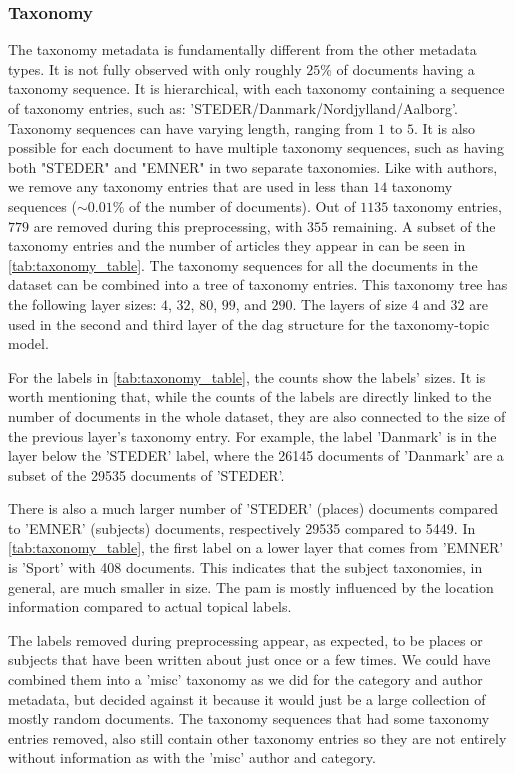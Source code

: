 \subsubsection{Taxonomy}\label{subsec:appendix_taxonomy}
The taxonomy metadata is fundamentally different from the other metadata types.
It is not fully observed with only roughly $25\%$ of documents having a taxonomy sequence.
It is hierarchical, with each taxonomy containing a sequence of taxonomy entries, such as: 'STEDER/Danmark/Nordjylland/Aalborg'.
Taxonomy sequences can have varying length, ranging from $1$ to $5$.
It is also possible for each document to have multiple taxonomy sequences, such as having both "STEDER" and "EMNER" in two separate taxonomies.
Like with authors, we remove any taxonomy entries that are used in less than $14$ taxonomy sequences (${\sim}0.01\%$ of the number of documents).
Out of $1135$ taxonomy entries, $779$ are removed during this preprocessing, with $355$ remaining.
A subset of the taxonomy entries and the number of articles they appear in can be seen in \autoref{tab:taxonomy_table}.
The taxonomy sequences for all the documents in the dataset can be combined into a tree of taxonomy entries.
This taxonomy tree has the following layer sizes: $4$, $32$, $80$, $99$, and $290$.
The layers of size $4$ and $32$ are used in the second and third layer of the \gls{dag} structure for the taxonomy-topic model.

For the labels in \autoref{tab:taxonomy_table}, the counts show the labels' sizes.
It is worth mentioning that, while the counts of the labels are directly linked to the number of documents in the whole dataset, they are also connected to the size of the previous layer's taxonomy entry.
For example, the label 'Danmark' is in the layer below the 'STEDER' label, where the 26145 documents of 'Danmark' are a subset of the 29535 documents of 'STEDER'.

There is also a much larger number of 'STEDER' (places) documents compared to 'EMNER' (subjects) documents, respectively 29535 compared to 5449.
In \autoref{tab:taxonomy_table}, the first label on a lower layer that comes from 'EMNER' is 'Sport' with 408 documents.
This indicates that the subject taxonomies, in general, are much smaller in size.
The \gls{pam} is mostly influenced by the location information compared to actual topical labels.

The labels removed during preprocessing appear, as expected, to be places or subjects that have been written about just once or a few times.
We could have combined them into a 'misc' taxonomy as we did for the category and author metadata, but decided against it because it would just be a large collection of mostly random documents.
The taxonomy sequences that had some taxonomy entries removed, also still contain other taxonomy entries so they are not entirely without information as with the 'misc' author and category.

